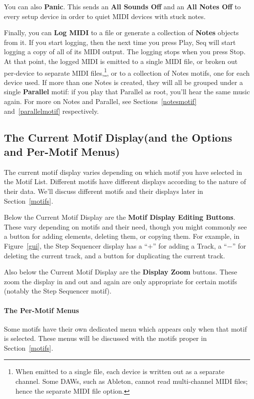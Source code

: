 \documentclass[twoside,10pt]{article}
\begin{document}
You can also {\bf Panic}.  This sends an {\bf All Sounds Off} and an {\bf All Notes Off} to every setup device in order to quiet MIDI devices with stuck notes.

Finally, you can {\bf Log MIDI} to a file or generate a collection of {\bf Notes} objects from it.  If you start logging, then the next time you press Play, Seq will start logging a copy of all of its MIDI output.  The logging stops when you press Stop.  At that point, the logged MIDI is emitted to a single MIDI file, or broken out per-device to separate MIDI files,\footnote{When emitted to a single file, each device is written out as a separate channel.  Some DAWs, such as Ableton, cannot read multi-channel MIDI files; hence the separate MIDI file option.}, or to a collection of Notes motifs, one for each device used.  If more than one Notes is created, they will all be grouped under a single {\bf Parallel} motif: if you play that Parallel as root, you'll hear the same music again.  For more on Notes and Parallel, see Sections~\ref{notesmotif} and~\ref{parallelmotif} respectively.

\subsection{The Current Motif Display\quad (and the Options and Per-Motif Menus)}

The current motif display varies depending on which motif you have selected in the Motif List.  Different motifs have different displays according to the nature of their data.  We'll discuss different motifs and their displays later in Section~\ref{motifs}.  

 Below the Current Motif Display are the {\bf Motif Display Editing Buttons}.  These vary depending on motifs and their need, though you might commonly see a button for adding elements, deleting them, or copying them.  For example, in Figure~\ref{gui}, the Step Sequencer display has a ``\(+\)'' for adding a Track, a ``\(-\)'' for deleting the current track, and a button for duplicating the current track.

Also below the Current Motif Display are the {\bf Display Zoom} buttons.  These zoom the display in and out and again are only appropriate for certain motifs (notably the Step Sequencer motif).

\paragraph{The Per-Motif Menus}  Some motifs have their own dedicated menu which appears only when that motif is selected.  These menus will be discussed with the motifs proper in Section~\ref{motifs}.
\end{document}
